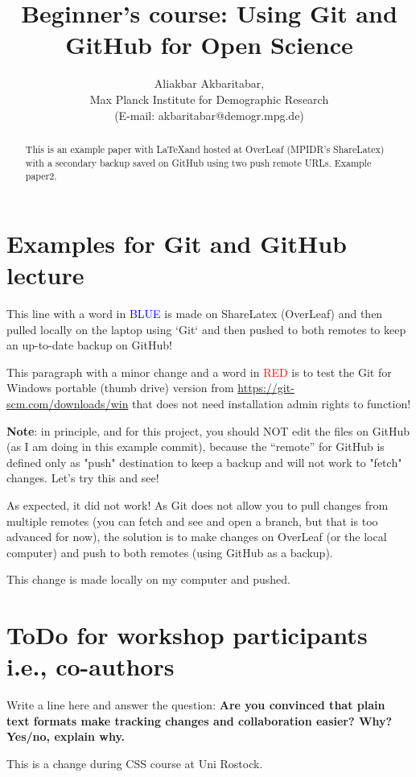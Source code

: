\documentclass{article}
\title{Beginner's course: Using Git and GitHub for Open Science}
\author{Aliakbar Akbaritabar, \\Max Planck Institute for Demographic Research \\(E-mail: akbaritabar@demogr.mpg.de)}
\begin{document}
\maketitle

\begin{abstract}
This is an example paper with \LaTeX and hosted at OverLeaf (MPIDR's ShareLatex) with a secondary backup saved on GitHub using two push remote URLs. Example paper2.
\end{abstract}

\section*{Examples for Git and GitHub lecture}

This line with a word in \textcolor{blue}{BLUE} is made on ShareLatex (OverLeaf) and then pulled locally on the laptop using `Git` and then pushed to both remotes to keep an up-to-date backup on GitHub!

This paragraph with a minor change and a word in \textcolor{red}{RED} is to test the Git for Windows portable (thumb drive) version from \url{https://git-scm.com/downloads/win} that does not need installation admin rights to function!

\textbf{Note}: in principle, and for this project, you should NOT edit the files on GitHub (as I am doing in this example commit), because the ``remote'' for GitHub is defined only as "push" destination to keep a backup and will not work to "fetch" changes. Let's try this and see! 

As expected, it did not work! As Git does not allow you to pull changes from multiple remotes (you can fetch and see and open a branch, but that is too advanced for now), the solution is to make changes on OverLeaf (or the local computer) and push to both remotes (using GitHub as a backup).


This change is made locally on my computer and pushed.

\section*{ToDo for workshop participants i.e., co-authors}

Write a line here and answer the question: \textbf{Are you convinced that plain text formats make tracking changes and collaboration easier? Why? Yes/no, explain why.}

This is a change during CSS course at Uni Rostock.
\end{document}
